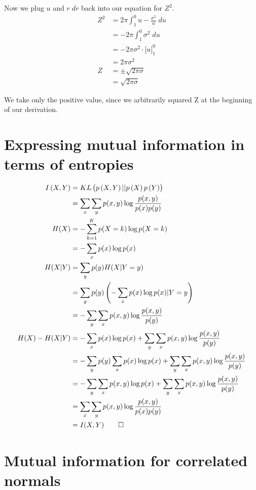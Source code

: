 \documentclass{article}
\begin{document}
Now we plug $u$ and $r \; dr$ back into our equation for $Z^2$.
\begin{align*}
  Z^2 &= 2\pi \int_1^0{u -\frac{\sigma^{2}}{u}} \; du \\
  &= -2\pi \int_1^0{\sigma^{2}} \; du \\
  &= -2\pi \sigma^{2} \cdot \Big[ u \Big]_1^0 \\
  &= 2\pi \sigma^{2} \\
  Z &= \pm \sqrt{2\pi\sigma} \\
  &= \sqrt{2\pi\sigma}
\end{align*}

We take only the positive value, since we arbitrarily squared Z at the
beginning of our derivation.

\section{Expressing mutual information in terms of entropies}

\begin{align*}
  I \left( X, Y \right) &= KL \left( p \left( X,Y \right) || p \left( X \right) p
  \left( Y \right) \right) \\
  &= \sum_x \sum_y p(x,y) \log \frac{p(x,y)}{p(x)p(y)} \\
  H(X) &= - \sum_{k=1}^K p(X=k) \log p(X=k) \\
  &= - \sum_x p(x) \log p(x) \\
  H(X|Y) &= \sum_y p(y) H(X|Y=y) \\
  &= \sum_y p(y) \left( - \sum_x p(x) \log p(x) | Y=y \right) \\
  &= - \sum_y \sum_x p(x,y) \log \frac{p(x,y)}{p(y)} \\
  H(X) - H(X|Y) &= - \sum_x p(x) \log p(x) + \sum_y \sum_x p(x,y) \log
                  \frac{p(x,y)}{p(y)} \\
  &= - \sum_y{p(y)} \sum_xp(x) \log p(x) + \sum_y \sum_x p(x,y) \log
    \frac{p(x,y)}{p(y)} \\
  &= - \sum_y \sum_x p(x,y) \log p(x) + \sum_y \sum_x p(x,y) \log
    \frac{p(x,y)}{p(y)} \\
  &= \sum_x \sum_y p(x,y) \log \frac{p(x,y)}{p(x)p(y)} \\
  &= I(X,Y) \qed
\end{align*}

\section{Mutual information for correlated normals}
\end{document}
